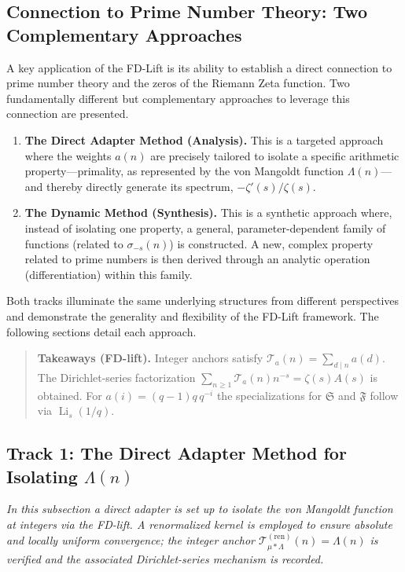 \documentclass[11pt,a4paper]{amsart}
\theoremstyle{plain}
\theoremstyle{definition}
\theoremstyle{remark}
\begin{document}
\subsection{Connection to Prime Number Theory: Two Complementary Approaches}

A key application of the FD-Lift is its ability to establish a direct connection to prime number theory and the zeros of the Riemann Zeta function. Two fundamentally different but complementary approaches to leverage this connection are presented.
\begin{enumerate}
    \item \textbf{The Direct Adapter Method (Analysis).} This is a targeted approach where the weights $a(n)$ are precisely tailored to isolate a specific arithmetic property---primality, as represented by the von Mangoldt function $\Lambda(n)$---and thereby directly generate its spectrum, $-\zeta'(s)/\zeta(s)$.
    \item \textbf{The Dynamic Method (Synthesis).} This is a synthetic approach where, instead of isolating one property, a general, parameter-dependent family of functions (related to $\sigma_{-s}(n)$) is constructed. A new, complex property related to prime numbers is then derived through an analytic operation (differentiation) within this family.
\end{enumerate}
Both tracks illuminate the same underlying structures from different perspectives and demonstrate the generality and flexibility of the FD-Lift framework. The following sections detail each approach.

\begin{quote}\small
\textbf{Takeaways (FD-lift).}
Integer anchors satisfy $\mathcal T_a(n)=\sum_{d\mid n}a(d)$.
The Dirichlet-series factorization $\sum_{n\ge1}\mathcal T_a(n)n^{-s}=\zeta(s)A(s)$ is obtained.
For $a(i)=(q-1)q\,q^{-i}$ the specializations for $\mathfrak S$ and $\mathfrak F$ follow via $\operatorname{Li}_s(1/q)$.
\end{quote}


\subsection{Track 1: The Direct Adapter Method for Isolating \texorpdfstring{$\Lambda(n)$}{Lambda(n)}}

\par\smallskip
\noindent\textit{In this subsection a direct adapter is set up to isolate the von Mangoldt function at integers via the FD-lift. A renormalized kernel is employed to ensure absolute and locally uniform convergence; the integer anchor $\mathcal T^{(\mathrm{ren})}_{\mu*\Lambda}(n)=\Lambda(n)$ is verified and the associated Dirichlet-series mechanism is recorded.}
\par\medskip
\end{document}
